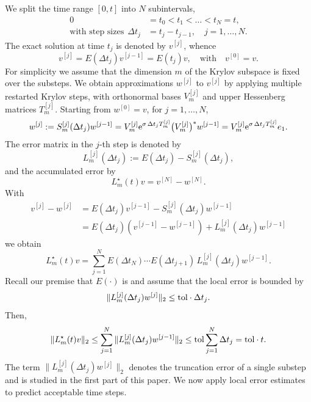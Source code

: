 \documentclass[smallextended]{svjour3pre}%
\numberwithin{equation}{section}
\numberwithin{figure}{section}
\numberwithin{table}{section}
\newcommand{\ttol}{{\rm tol}}
\newcommand{\ee}{{\rm e}}
\newcommand\Vmj{V_m^{[j]}}
\newcommand\Tmj{T_m^{[j]}}
\newcommand\Smj{S_m^{[j]}}
\newcommand\Lmj{L_m^{[j]}}
\newcommand\mw[1]{w^{[#1]}}
\newcommand\mv[1]{v^{[#1]}}
\newcommand\sca{\sigma}
\begin{document}
We split the time range $[0,t]$ into $N$ subintervals,
\begin{align*}
0&=t_0<t_1<\ldots<t_N=t, \\
\text{with step sizes}~~\Delta t_j&= t_{j}-t_{j-1},\quad j=1,\ldots,N.
\end{align*}
The exact solution at time $t_j$ is denoted by $ \mv{j} $, whence
\begin{equation*}
\mv{j} = E(\Delta t_{j})\mv{j-1}=E(t_{j})v,\quad\text{with}\quad \mv{0}=v.
\end{equation*}
For simplicity we assume that the dimension $m$ of the Krylov subspace is fixed
over the substeps.
We obtain approximations $ \mw{j }$ to $ \mv{j} $ by applying multiple restarted
Krylov steps, with orthonormal bases $ \Vmj $ and upper Hessenberg matrices $ \Tmj $.
Starting from $ \mw{0} = v $, for $ j=1,\ldots,N $,
\begin{align*}
\mw{j} := \Smj(\Delta t_{j}) \mw{j-1}
       = \Vmj \ee^{\sca\,\Delta t_{j} \Tmj} \big(\Vmj\big)^\ast \mw{j-1}
       = \Vmj \ee^{\sca\,\Delta t_{j} \Tmj}e_1.
\end{align*}
The error matrix in the $j$-th step is denoted by
\begin{equation*}
\Lmj(\Delta t_{j}) := E(\Delta t_{j})-\Smj(\Delta t_{j}),
\end{equation*}
and the accumulated error by
\begin{equation} \label{Lmstar}
L_m^{\star}(t)v=\mv{N}-\mw{N}.
\end{equation}
With
\begin{align*}
\mv{j}-\mw{j} &= E(\Delta t_j)\mv{j-1}-\Smj(\Delta t_j) \mw{j-1} \\
&= E(\Delta t_j)(\mv{j-1}-\mw{j-1}) +
\Lmj(\Delta t_j) \mw{j-1}
\end{align*}
we obtain
\begin{equation*}
L_m^{\star}(t)v = \sum_{j=1}^N E(\Delta t_N)\cdots E(\Delta t_{j+1})\,\Lmj(\Delta t_j) \mw{j-1}.
\end{equation*}
Recall our premise that $E(\cdot)$ is 
and assume that the local error is bounded by
\begin{equation}\label{localerror}
\|\Lmj(\Delta t_j)\mw{j}\|_2 \leq  \ttol \cdot \Delta t_j.
\end{equation}
Then,
\begin{equation*}
\|L_m^{\star}(t)v\|_2
\leq \sum_{j=1}^N \|\Lmj(\Delta t_j) \mw{j-1}\|_2 \leq  \ttol \sum_{j=1}^N \Delta t_j  = \ttol \cdot t.
\end{equation*}
The term $\|\Lmj(\Delta t_j)\mw{j}\|_2$ denotes the truncation error of a single substep and is studied in the first part of this paper.
We now apply local error estimates to predict acceptable time steps.
\end{document}
